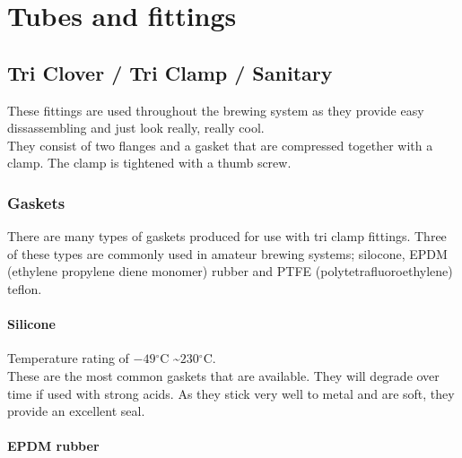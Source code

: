 \documentclass[11pt,fleqn]{book} %
\newcommand{\degree}{\ensuremath{^\circ}}
\begin{document}
\pagestyle{fancy} %



\chapter{Tubes and fittings}

\section{Tri Clover / Tri Clamp / Sanitary}

These fittings are used throughout the brewing system as they provide easy dissassembling and just look really, really cool.\\

They consist of two flanges and a gasket that are compressed together with a clamp. The clamp is tightened with a thumb screw.

\subsection{Gaskets}

There are many types of gaskets produced for use with tri clamp fittings. Three of these types are commonly used in amateur brewing systems; silocone, EPDM (ethylene propylene diene monomer) rubber and PTFE (polytetrafluoroethylene) teflon.

\subsubsection{Silicone}

Temperature rating of $-49\degree$C \textasciitilde $230\degree$C.\\
These are the most common gaskets that are available. They will degrade over time if used with strong acids. As they stick very well to metal and are soft, they provide an excellent seal.

\subsubsection{EPDM rubber}
\end{document}
